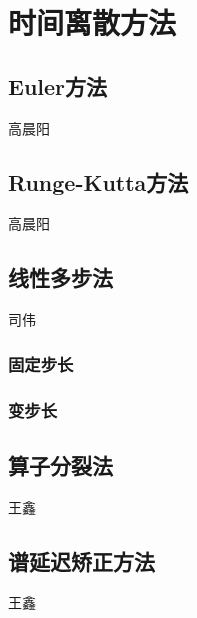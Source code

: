 \section{时间离散方法}

\subsection{Euler方法}
{\color{red}\begin{center}
     高晨阳
\end{center}}

\subsection{Runge-Kutta方法}
{\color{red}\begin{center}
     高晨阳
\end{center}}

\subsection{线性多步法}
{\color{red}\begin{center}
     司伟
\end{center}}
\subsubsection{固定步长}
\subsubsection{变步长}



\subsection{算子分裂法}
{\color{red}\begin{center}
    王鑫
\end{center}}


\subsection{谱延迟矫正方法}
{\color{red}\begin{center}
    王鑫
\end{center}}



